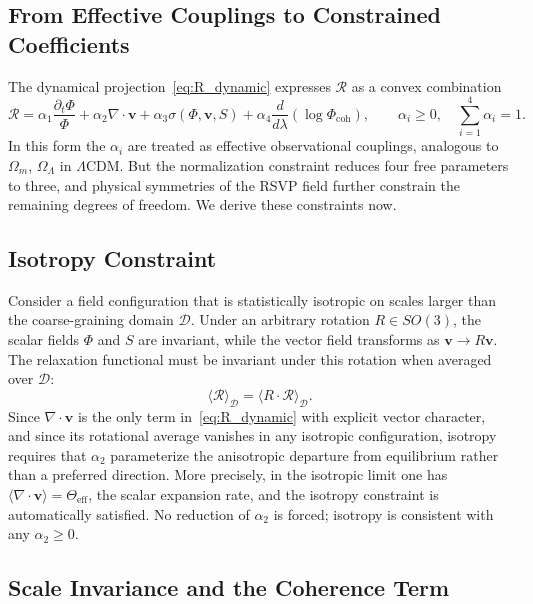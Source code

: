 \documentclass[12pt,a4paper]{article}
\theoremstyle{remark}
\newcommand{\vv}{\mathbf{v}}
\newcommand{\Rcal}{\mathcal{R}}
\begin{document}
\subsection{From Effective Couplings to Constrained Coefficients}

The dynamical projection~\eqref{eq:R_dynamic} expresses $\Rcal$ as a convex combination
\begin{equation}
\Rcal = \alpha_1 \frac{\partial_t \Phi}{\Phi} + \alpha_2 \nabla \cdot \vv
      + \alpha_3 \sigma(\Phi,\vv,S)
      + \alpha_4 \frac{d}{d\lambda}\!\left(\log \Phi_{\mathrm{coh}}\right),
\qquad \alpha_i \ge 0, \quad \sum_{i=1}^4 \alpha_i = 1.
\end{equation}
In this form the $\alpha_i$ are treated as effective observational couplings,
analogous to $\Omega_m$, $\Omega_\Lambda$ in $\Lambda$CDM. But the
normalization constraint reduces four free parameters to three, and physical
symmetries of the RSVP field further constrain the remaining degrees of freedom.
We derive these constraints now.

\subsection{Isotropy Constraint}

Consider a field configuration that is statistically isotropic on scales
larger than the coarse-graining domain $\mathcal{D}$. Under an arbitrary
rotation $R \in SO(3)$, the scalar fields $\Phi$ and $S$ are invariant,
while the vector field transforms as $\vv \to R\vv$. The relaxation functional
must be invariant under this rotation when averaged over $\mathcal{D}$:
\begin{equation}
\langle \Rcal \rangle_{\mathcal{D}} = \langle R\cdot\Rcal \rangle_{\mathcal{D}}.
\end{equation}
Since $\nabla \cdot \vv$ is the only term in~\eqref{eq:R_dynamic} with explicit
vector character, and since its rotational average vanishes in any isotropic
configuration, isotropy requires that $\alpha_2$ parameterize the anisotropic
departure from equilibrium rather than a preferred direction. More precisely,
in the isotropic limit one has $\langle \nabla \cdot \vv \rangle = \Theta_{\mathrm{eff}}$,
the scalar expansion rate, and the isotropy constraint is automatically
satisfied. No reduction of $\alpha_2$ is forced; isotropy is consistent with
any $\alpha_2 \ge 0$.

\subsection{Scale Invariance and the Coherence Term}
\end{document}
